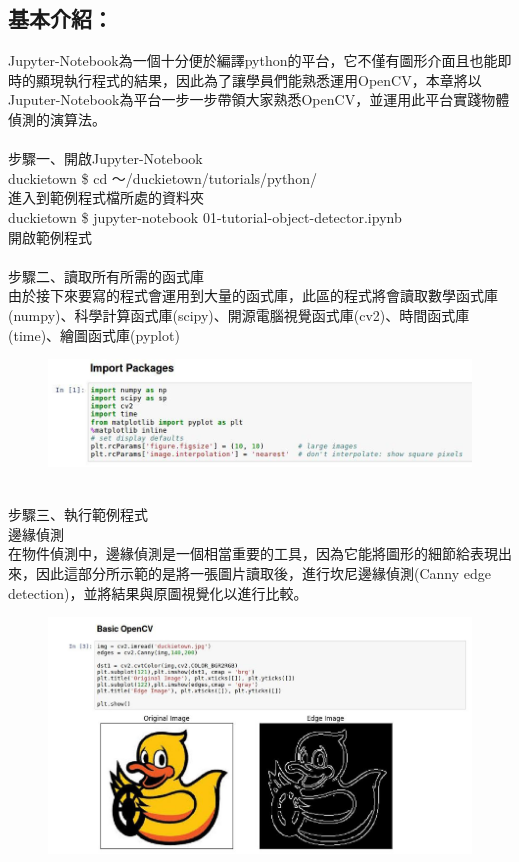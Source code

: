 \documentclass{article}
\begin{document}
\subsection{基本介紹：}
Jupyter-Notebook為一個十分便於編譯python的平台，它不僅有圖形介面且也能即時的顯現執行程式的結果，因此為了讓學員們能熟悉運用OpenCV，本章將以Juputer-Notebook為平台一步一步帶領大家熟悉OpenCV，並運用此平台實踐物體偵測的演算法。
\\\\步驟一、開啟Jupyter-Notebook
\\duckietown \$ cd ～/duckietown/tutorials/python/
\\進入到範例程式檔所處的資料夾
\\duckietown \$ jupyter-notebook 01-tutorial-object-detector.ipynb
\\開啟範例程式
\\\\步驟二、讀取所有所需的函式庫
\\由於接下來要寫的程式會運用到大量的函式庫，此區的程式將會讀取數學函式庫(numpy)、科學計算函式庫(scipy)、開源電腦視覺函式庫(cv2)、時間函式庫(time)、繪圖函式庫(pyplot)
\
\begin{figure}[htp]
    \begin{center}
        \includegraphics[width=400pt]{pic/5_1_1.png}
    \end{center}
\end{figure}
\\
步驟三、執行範例程式
\\邊緣偵測
\\在物件偵測中，邊緣偵測是一個相當重要的工具，因為它能將圖形的細節給表現出來，因此這部分所示範的是將一張圖片讀取後，進行坎尼邊緣偵測(Canny edge detection)，並將結果與原圖視覺化以進行比較。
\
\begin{figure}[htp]
    \begin{center}
        \includegraphics[width=400pt]{pic/5_1_2.png}
    \end{center}
\end{figure}
\end{document}
